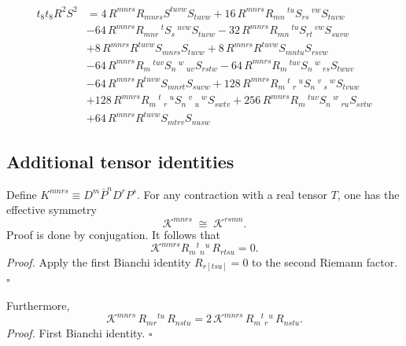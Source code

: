 \begin{equation}
\begin{aligned}
t_8 t_8 R^2 S^2 &=
{}4\,R^{m n r s} R_{m n r s} S^{t u v w} S_{t u v w}+16\,R^{m n r s} R_{m n}\,^{t u} S_{r s}\,^{v w} S_{t u v w}\\
&-64\,R^{m n r s} R_{m n r}\,^{t} S_{s}\,^{u v w} S_{t u v w}-32\,R^{m n r s} R_{m n}\,^{t u} S_{r t}\,^{v w} S_{s u v w}\\
&+8\,R^{m n r s} R^{t u v w} S_{m n r s} S_{t u v w}+8\,R^{m n r s} R^{t u v w} S_{m n t u} S_{r s v w}\\
&-64\,R^{m n r s} R_{m}\,^{t u v} S_{n}\,^{w}\,_{u v} S_{r s t w}-64\,R^{m n r s} R_{m}\,^{t u v} S_{n}\,^{w}\,_{r s} S_{t w u v}\\
&-64\,R^{m n r s} R^{t u v w} S_{m n r t} S_{s u v w}+128\,R^{m n r s} R_{m}\,^{t}\,_{r}\,^{u} S_{n}\,^{v}\,_{s}\,^{w} S_{t v u w}\\
&+128\,R^{m n r s} R_{m}\,^{t}\,_{r}\,^{u} S_{n}\,^{v}\,_{u}\,^{w} S_{s w t v}+256\,R^{m n r s} R_{m}\,^{t u v} S_{n}\,^{w}\,_{r u} S_{s v t w}\\
&+64\,R^{m n r s} R^{t u v w} S_{m t r v} S_{n u s w}
\label{eq:t8R2S2}
\end{aligned}
\end{equation}

\subsection{Additional tensor identities}
Define $K^{mnrs} \equiv D^m\bar{P}^n D^r P^s$.
For any contraction with a real tensor $T$, one has the effective symmetry
\begin{equation}
    \mathcal{K}^{mnrs} \;\cong\; \mathcal{K}^{rsmn}.
\end{equation}
Proof is done by conjugation.
It follows that
\begin{equation}\label{eq:K_vanish}
    \mathcal{K}^{mnrs}R_{m}{}^{t}{}_{n}{}^{u}\,R_{rtsu} = 0.
\end{equation}
\emph{Proof.}
Apply the first Bianchi identity $R_{r[tsu]}=0$ to the second Riemann factor. \(\square\)

Furthermore,
\begin{equation}\label{eq:K_bianchi}
    \mathcal{K}^{mnrs}\,R_{mr}{}^{tu}\,R_{nstu}
    = 2\,\mathcal{K}^{mnrs}\,R_{m}{}^{t}{}_{r}{}^{u}\,R_{nstu}.
\end{equation}
\emph{Proof.}
First Bianchi identity. \(\square\)
